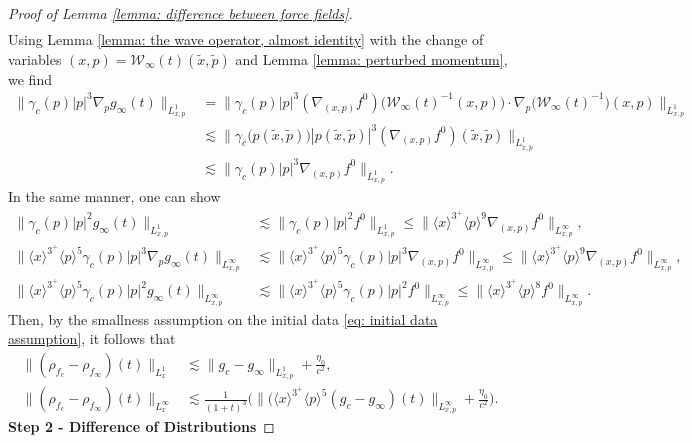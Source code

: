 \documentclass[reqno, 11pt, letterpaper]{amsart}
\theoremstyle{remark}
\numberwithin{equation}{section}
\numberwithin{theorem}{section}
\numberwithin{table}{section}
\numberwithin{figure}{section}
\begin{document}
\begin{proof}[Proof of Lemma \ref{lemma: difference between force fields}]
$$\begin{aligned}
\end{aligned}$$
Using Lemma \ref{lemma:  the wave operator, almost identity} with the change of variables $(x,p)=\mathcal{W}_\infty(t)(\tilde{x},\tilde{p})$ and Lemma \ref{lemma: perturbed momentum}, we find
$$\begin{aligned}
\big\|\gamma_c(p)|p|^3\nabla_pg_\infty(t)\big\|_{L_{x,p}^1}&=\Big\|\gamma_c(p)|p|^3(\nabla_{(x,p)}f^0)\Big(\mathcal{W}_\infty(t)^{-1}(x,p)\Big)\cdot\nabla_p\big(\mathcal{W}_\infty(t)^{-1}\big)(x,p)\Big\|_{L_{x,p}^1}\\
&\lesssim \Big\|\gamma_c\big(p(\tilde{x},\tilde{p})\big)|p(\tilde{x},\tilde{p})|^3(\nabla_{(x,p)}f^0)(\tilde{x},\tilde{p})\Big\|_{L_{\tilde{x},\tilde{p}}^1}\\
&\lesssim \big\|\gamma_c(p)|p|^3\nabla_{(x,p)}f^0\big\|_{L_{x,p}^1}.
\end{aligned}$$
In the same manner, one can show
$$\begin{aligned}
\big\|\gamma_c(p)|p|^2g_\infty(t)\big\|_{L_{x,p}^1}&\lesssim \big\|\gamma_c(p)|p|^2f^0\big\|_{L_{x,p}^1}\leq \Big\|\langle x\rangle^{3^+}\langle p\rangle^{9}\nabla_{(x,p)}f^0\Big\|_{L^\infty_{x,p}},\\
\Big\|\langle x\rangle^{3^+}\langle p\rangle^{5}\gamma_c(p)|p|^3\nabla_pg_\infty(t)\Big\|_{L^\infty_{x,p}}&\lesssim \Big\|\langle x\rangle^{3^+}\langle p\rangle^{5}\gamma_c(p)|p|^3\nabla_{(x,p)}f^0\Big\|_{L^\infty_{x,p}}
\leq \Big\|\langle x\rangle^{3^+}\langle p\rangle^{9}\nabla_{(x,p)}f^0\Big\|_{L^\infty_{x,p}},\\
\Big\|\langle x\rangle^{3^+}\langle p\rangle^{5}\gamma_c(p)|p|^2g_\infty(t)\Big\|_{L^\infty_{x,p}}&\lesssim \Big\|\langle x\rangle^{3^+}\langle p\rangle^{5}\gamma_c(p)|p|^2f^0\Big\|_{L^\infty_{x,p}}
\leq \Big\|\langle x\rangle^{3^+}\langle p\rangle^{8}f^0\Big\|_{L^\infty_{x,p}}.
\end{aligned}$$
Then, by the smallness assumption on the initial data \eqref{eq: initial data assumption}, it follows that  
\begin{equation}\label{eq: L1 Linfty rho difference bounds}
\begin{aligned}
\big\|(\rho_{f_c}-\rho_{f_\infty})(t)\big\|_{L_x^1}&\lesssim\|g_c-g_\infty\|_{L_{x,p}^1}+\frac{\eta_0}{c^2},\\
\big\|(\rho_{f_c}-\rho_{f_\infty})(t)\big\|_{L_x^\infty}&\lesssim\frac{1}{(1+t)^3}\bigg(\Big\|\Big(\langle x\rangle^{3^+}\langle p\rangle^5(g_c-g_\infty)(t)\Big\|_{L^\infty_{x,p}}+\frac{\eta_0}{c^2}\bigg).
\end{aligned}
\end{equation}
\textbf{Step 2 - Difference of Distributions} 


\end{proof}
\end{document}
